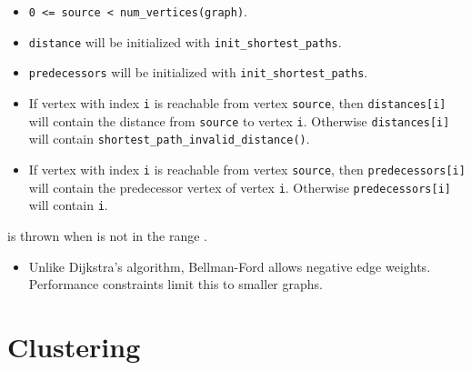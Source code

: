 \begin{itemdescr}
      \pnum\preconditions
            \begin{itemize}
                  \item
                        \lstinline{0 <= source < num_vertices(graph)}. 
                  \item
                        \lstinline{distance} will be initialized with \lstinline{init_shortest_paths}.
                  \item
                        \lstinline{predecessors} will be initialized with \lstinline{init_shortest_paths}.
            \end{itemize}
      \pnum\effects
            \begin{itemize}
                  \item
                        If vertex with index \lstinline{i} is reachable from vertex \lstinline{source}, then
                        \lstinline{distances[i]} will contain the distance from \lstinline{source} to vertex
                        \lstinline{i}.  Otherwise \lstinline{distances[i]} will contain
                        \lstinline{shortest_path_invalid_distance()}.
                  \item
                        If vertex with index \lstinline{i} is reachable
                        from vertex \lstinline{source}, then \lstinline{predecessors[i]} will contain the
                        predecessor vertex of vertex \lstinline{i}. Otherwise \lstinline{predecessors[i]} will contain
                        \lstinline{i}.
            \end{itemize}
      \pnum\throws {} is thrown when  is not in the range .  \\
      \pnum\remarks 
            \begin{itemize}
                  \item
                        Unlike Dijkstra's algorithm, Bellman-Ford allows negative edge weights. Performance constraints limit this to smaller graphs.
            \end{itemize}
\end{itemdescr}


\section{Clustering}
